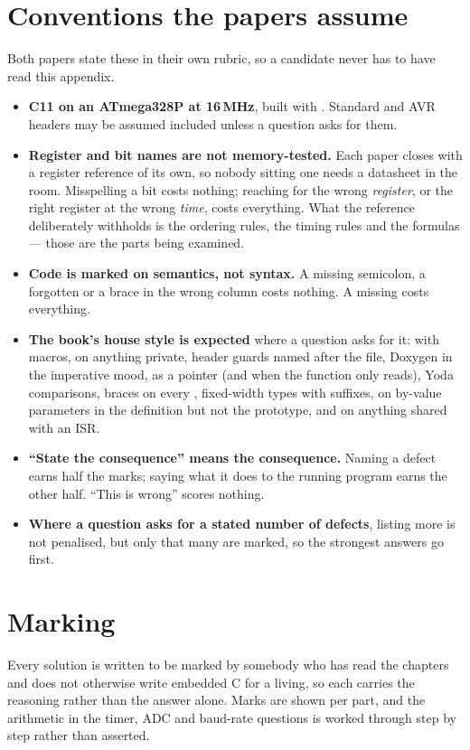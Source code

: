 \section*{Conventions the papers assume}
Both papers state these in their own rubric, so a candidate never has to have read this appendix.
\begin{itemize}
  \item \textbf{C11 on an ATmega328P at 16\,MHz}, built with . Standard and AVR
    headers may be assumed included unless a question asks for them.
  \item \textbf{Register and bit names are not memory-tested.} Each paper closes with a register
    reference of its own, so nobody sitting one needs a datasheet in the room. Misspelling a bit
    costs nothing; reaching for the wrong \emph{register}, or the right register at the wrong
    \emph{time}, costs everything. What the reference deliberately withholds is the ordering rules,
    the timing rules and the formulas --- those are the parts being examined.
  \item \textbf{Code is marked on semantics, not syntax.} A missing semicolon, a forgotten
     or a brace in the wrong column costs nothing. A missing  costs
    everything.
  \item \textbf{The book's house style is expected} where a question asks for it:
     with  macros,  on anything private, header
    guards named after the file, Doxygen in the imperative mood,  as a pointer (and
     when the function only reads), Yoda comparisons, braces on every ,
    fixed-width types with  suffixes,  on by-value parameters in the definition
    but not the prototype, and  on anything shared with an ISR.
  \item \textbf{``State the consequence'' means the consequence.} Naming a defect earns half the
    marks; saying what it does to the running program earns the other half. ``This is wrong''
    scores nothing.
  \item \textbf{Where a question asks for a stated number of defects}, listing more is not
    penalised, but only that many are marked, so the strongest answers go first.
\end{itemize}

\section*{Marking}
Every solution is written to be marked by somebody who has read the chapters and does not otherwise
write embedded C for a living, so each carries the reasoning rather than the answer alone. Marks
are shown per part, and the arithmetic in the timer, ADC and baud-rate questions is worked through
step by step rather than asserted.

